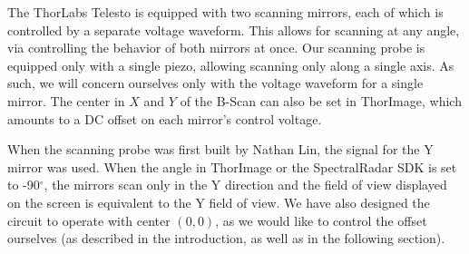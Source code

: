 \documentclass{article}
\begin{document}
\par{The ThorLabs Telesto is equipped with two scanning mirrors, each of which is controlled by a separate voltage waveform. This allows for scanning at any angle, via controlling the behavior of both mirrors at once. Our scanning probe is equipped only with a single piezo, allowing scanning only along a single axis. As such, we will concern ourselves only with the voltage waveform for a single mirror. The center in $X$ and $Y$ of the B-Scan can also be set in ThorImage, which amounts to a DC offset on each mirror's control voltage.}
\par{When the scanning probe was first built by Nathan Lin, the signal for the Y mirror was used. When the angle in ThorImage or the SpectralRadar SDK is set to -90$^\circ$, the mirrors scan only in the Y direction and the field of view displayed on the screen is equivalent to the Y field of view. We have also designed the circuit to operate with center $(0,0)$, as we would like to control the offset ourselves (as described in the introduction, as well as in the following section).}
\end{document}
